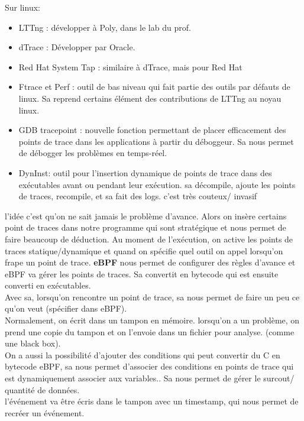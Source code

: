 \documentclass[oneside]{book}
\begin{document}
Sur linux:
\begin{itemize}
\item LTTng : développer à Poly, dans le lab du prof.
\item dTrace : Développer par Oracle.
\item Red Hat System Tap : similaire à dTrace, mais pour Red Hat
\item Ftrace et Perf : outil de bas niveau qui fait partie des outils par défauts de linux. Sa reprend certains élément des contributions de LTTng au noyau linux.
\item GDB tracepoint : nouvelle fonction permettant de placer efficacement des points de trace dans les applications à partir du déboggeur. Sa nous permet de débogger les problèmes en temps-réel. 
\item DynInst: outil pour l'insertion dynamique de points de trace dans des exécutables avant ou pendant leur exécution. sa décompile, ajoute les points de traces, recompile, et sa fait des logs. c'est très couteux/ invasif 
\end{itemize}

l'idée c'est qu'on ne sait jamais le problème d'avance. Alors on insère certains point de traces dans notre programme qui sont stratégique et nous permet de faire beaucoup de déduction. Au moment de l'exécution, on active les points de traces statique/dynamique et quand on spécifie quel outil on appel lorsqu'on frape un point de trace. \textbf{eBPF} nous permet de configurer des règles d'avance et eBPF va gérer les points de traces. Sa convertit en bytecode qui est ensuite converti en exécutables.\\

Avec sa, lorsqu'on rencontre un point de trace, sa nous permet de faire un peu ce qu'on veut (spécifier dans eBPF).\\

Normalement, on écrit dans un tampon en mémoire. lorsqu'on a un problème, on prend une copie du tampon et on l'envoie dans un fichier pour analyse. (comme une black box).\\

On a aussi la possibilité d'ajouter des conditions qui peut convertir du C en bytecode eBPF, sa nous permet d'associer des conditions en points de trace qui est dynamiquement associer aux variables.. Sa nous permet de gérer le surcout/ quantité de données.\\

l'événement va être écris dans le tampon avec un timestamp, qui nous permet de recréer un événement. \\
\end{document}
